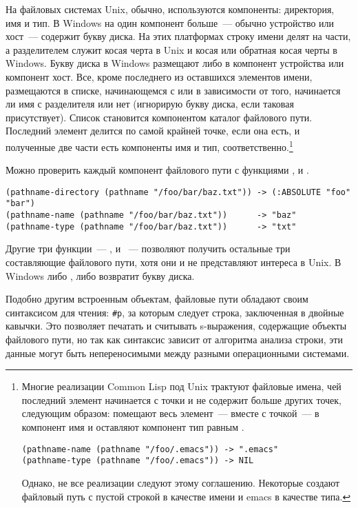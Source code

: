 На файловых системах Unix, обычно, используются компоненты: директория, имя и тип. В
Windows на один компонент больше~--- обычно устройство или хост~--- содержит букву диска. На
этих платформах строку имени делят на части, а разделителем служит косая черта в Unix и
косая или обратная косая черты в Windows. Букву диска в Windows размещают либо в компонент
устройства или компонент хост. Все, кроме последнего из оставшихся элементов имени,
размещаются в списке, начинающемся с  или  в зависимости
от того, начинается ли имя с разделителя или нет (игнорирую букву диска, если таковая
присутствует). Список становится компонентом каталог файлового пути. Последний элемент
делится по самой крайней точке, если она есть, и полученные две части есть компоненты имя
и тип, соответственно.\footnote{Многие реализации Common Lisp под Unix трактуют файловые
  имена, чей последний элемент начинается с точки и не содержит больше других точек,
  следующим образом: помещают весь элемент~--- вместе с точкой~--- в компонент имя и
  оставляют компонент тип равным .

\begin{lstlisting}
(pathname-name (pathname "/foo/.emacs")) -> ".emacs" 
(pathname-type (pathname "/foo/.emacs")) -> NIL 
\end{lstlisting}

Однако, не все реализации следуют этому соглашению. Некоторые создают файловый путь с
пустой строкой в качестве имени и emacs в качестве типа.}

Можно проверить каждый компонент файлового пути с функциями ,
 и .

\begin{lstlisting}
(pathname-directory (pathname "/foo/bar/baz.txt")) -> (:ABSOLUTE "foo" "bar") 
(pathname-name (pathname "/foo/bar/baz.txt"))      -> "baz" 
(pathname-type (pathname "/foo/bar/baz.txt"))      -> "txt" 
\end{lstlisting}

Другие три функции~--- ,  и
~--- позволяют получить остальные три составляющие файлового пути,
хотя они и не представляют интереса в Unix. В Windows либо , либо
 возвратит букву диска.

Подобно другим встроенным объектам, файловые пути обладают своим синтаксисом для чтения:
\lstinline!#p!, за которым следует строка, заключенная в двойные кавычки. Это позволяет
печатать и считывать s-выражения, содержащие объекты файлового пути, но так как синтаксис
зависит от алгоритма анализа строки, эти данные могут быть непереносимыми между разными
операционными системами.

